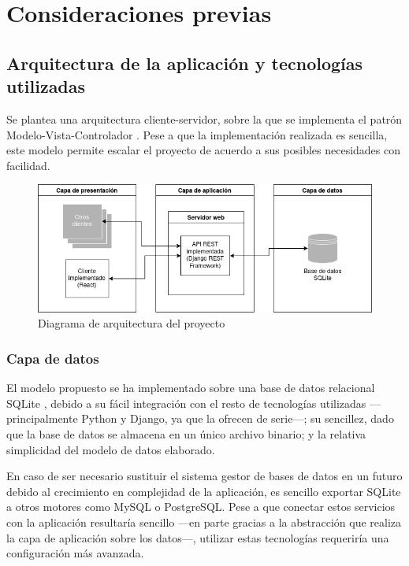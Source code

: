 \documentclass[10pt, a4paper]{aqademic}
\begin{document}
\section{Consideraciones previas}

\subsection{Arquitectura de la aplicación y tecnologías utilizadas}

Se plantea una arquitectura cliente-servidor, sobre la que se implementa el patrón Modelo-Vista-Controlador \cite{Uyun2010IMPLEMENTATIONOM}.
Pese a que la implementación realizada es sencilla, este modelo permite escalar el proyecto de acuerdo a sus posibles necesidades con facilidad.

\begin{figure}[h]
	\centering
	\includegraphics[scale=0.6]{img/arquitectura.png}
	\caption{Diagrama de arquitectura del proyecto}
\end{figure}

\subsubsection*{Capa de datos}

El modelo propuesto se ha implementado sobre una base de datos relacional SQLite \cite{noauthor_sqlite3_nodate}, debido a su fácil integración
con el resto de tecnologías utilizadas ---principalmente Python y Django, ya que la ofrecen de serie---;
su sencillez, dado que la base de datos se almacena en un único archivo binario; y la relativa simplicidad del modelo de datos elaborado.

En caso de ser necesario sustituir el sistema gestor de bases de datos en un futuro debido al crecimiento en complejidad de la aplicación,
es sencillo exportar SQLite a otros motores como MySQL o PostgreSQL. 
Pese a que conectar estos servicios con la aplicación resultaría sencillo ---en parte gracias a la abstracción
que realiza la capa de aplicación sobre los datos---, utilizar estas tecnologías requeriría una configuración más avanzada.
\end{document}
